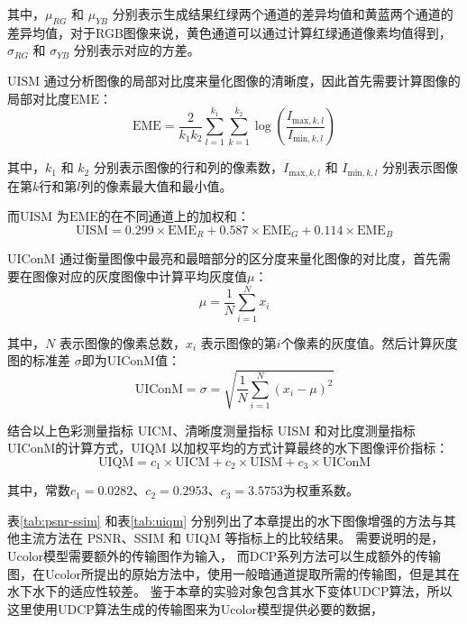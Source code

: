 其中，$\mu_{RG}$ 和 $\mu_{YB}$ 分别表示生成结果红绿两个通道的差异均值和黄蓝两个通道的差异均值，对于RGB图像来说，黄色通道可以通过计算红绿通道像素均值得到，
$\sigma_{RG}$ 和 $\sigma_{YB}$ 分别表示对应的方差。

$\mathrm{UISM}$ 通过分析图像的局部对比度来量化图像的清晰度，因此首先需要计算图像的局部对比度$\mathrm{EME}$：
\begin{equation}
    \mathrm{EME} = \frac{2}{k_1 k_2} \sum_{l=1}^{k_1} \sum_{k=1}^{k_2} \log \left( \frac{I_{\text{max},k,l}}{I_{\text{min},k,l}} \right)
\end{equation}

其中，$k_1$ 和 $k_2$ 分别表示图像的行和列的像素数，$I_{\text{max},k,l}$ 和 $I_{\text{min},k,l}$ 分别表示图像在第$k$行和第$l$列的像素最大值和最小值。

而$\mathrm{UISM}$ 为$\mathrm{EME}$的在不同通道上的加权和：
\begin{equation}
    \mathrm{UISM} = 0.299 \times \mathrm{EME}_{R} + 0.587 \times \mathrm{EME}_{G} + 0.114 \times \mathrm{EME}_{B}
\end{equation}

$\mathrm{UIConM}$ 通过衡量图像中最亮和最暗部分的区分度来量化图像的对比度，首先需要在图像对应的灰度图像中计算平均灰度值$\mu$：
\begin{equation}
   \mu = \frac{1}{N} \sum_{i=1}^{N} x_i
\end{equation}

其中，$N$ 表示图像的像素总数，$x_i$ 表示图像的第$i$个像素的灰度值。然后计算灰度图的标准差 \(\sigma\)即为UIConM值：
\begin{equation}
    \mathrm{UIConM}=\sigma = \sqrt{\frac{1}{N} \sum_{i=1}^{N} (x_i - \mu)^2} 
\end{equation}

结合以上色彩测量指标 UICM、清晰度测量指标 UISM 和对比度测量指标 UIConM的计算方式，UIQM 以加权平均的方式计算最终的水下图像评价指标：
\begin{equation}
    \mathrm{UIQM}=c_1 \times \mathrm{UICM}+c_2 \times \mathrm{UISM}+c_3 \times \mathrm{UIConM}
\end{equation}

其中，常数$c_1=0.0282$、$c_2=0.2953$、$c_3=3.5753$为权重系数。

表\ref{tab:psnr-ssim}  和表\ref{tab:uiqm} 分别列出了本章提出的水下图像增强的方法与其他主流方法在 PSNR、SSIM 和 UIQM 等指标上的比较结果。
需要说明的是，Ucolor\cite{ucolor}模型需要额外的传输图作为输入，
而DCP系列方法可以生成额外的传输图，在Ucolor所提出的原始方法中，使用一般暗通道\cite{GDCP}提取所需的传输图，但是其在水下水下的适应性较差。
鉴于本章的实验对象包含其水下变体UDCP\cite{udcp}算法，所以这里使用UDCP算法生成的传输图来为Ucolor模型提供必要的数据，

